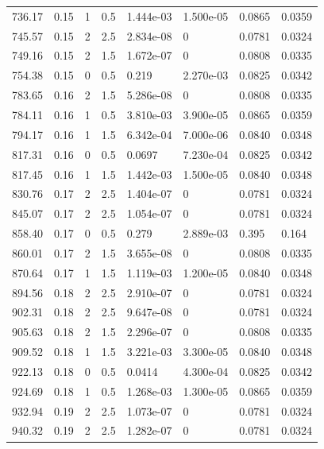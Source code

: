 \documentclass[preview]{standalone}
\begin{document}
{{{\begin{tabular}{L{1.2cm}C{1.2cm} C{0.3cm}C{0.5cm} C{1.4cm}C{1.4cm} C{1.4cm}C{1.4cm}}
  736.17  &  0.15  & 1     & 0.5 &  1.444e-03  & 1.500e-05  & 0.0865 &  0.0359   \\ 
  745.57  &  0.15  & 2     & 2.5 &  2.834e-08  & 0  & 0.0781 &  0.0324   \\ 
  749.16  &  0.15  & 2     & 1.5 &  1.672e-07  & 0  & 0.0808 &  0.0335   \\ 
  754.38  &  0.15  & 0     & 0.5 &  0.219  & 2.270e-03  & 0.0825 &  0.0342   \\ 
  783.65  &  0.16  & 2     & 1.5 &  5.286e-08  & 0  & 0.0808 &  0.0335   \\ 
  784.11  &  0.16  & 1     & 0.5 &  3.810e-03  & 3.900e-05  & 0.0865 &  0.0359   \\ 
  794.17  &  0.16  & 1     & 1.5 &  6.342e-04  & 7.000e-06  & 0.0840 &  0.0348   \\ 
  817.31  &  0.16  & 0     & 0.5 &  0.0697  & 7.230e-04  & 0.0825 &  0.0342   \\ 
  817.45  &  0.16  & 1     & 1.5 &  1.442e-03  & 1.500e-05  & 0.0840 &  0.0348   \\ 
  830.76  &  0.17  & 2     & 2.5 &  1.404e-07  & 0  & 0.0781 &  0.0324   \\ 
  845.07  &  0.17  & 2     & 2.5 &  1.054e-07  & 0  & 0.0781 &  0.0324   \\ 
  858.40  &  0.17  & 0     & 0.5 &  0.279  & 2.889e-03  & 0.395 &  0.164   \\ 
  860.01  &  0.17  & 2     & 1.5 &  3.655e-08  & 0  & 0.0808 &  0.0335   \\ 
  870.64  &  0.17  & 1     & 1.5 &  1.119e-03  & 1.200e-05  & 0.0840 &  0.0348   \\ 
  894.56  &  0.18  & 2     & 2.5 &  2.910e-07  & 0  & 0.0781 &  0.0324   \\ 
  902.31  &  0.18  & 2     & 2.5 &  9.647e-08  & 0  & 0.0781 &  0.0324   \\ 
  905.63  &  0.18  & 2     & 1.5 &  2.296e-07  & 0  & 0.0808 &  0.0335   \\ 
  909.52  &  0.18  & 1     & 1.5 &  3.221e-03  & 3.300e-05  & 0.0840 &  0.0348   \\ 
  922.13  &  0.18  & 0     & 0.5 &  0.0414  & 4.300e-04  & 0.0825 &  0.0342   \\ 
  924.69  &  0.18  & 1     & 0.5 &  1.268e-03  & 1.300e-05  & 0.0865 &  0.0359   \\ 
  932.94  &  0.19  & 2     & 2.5 &  1.073e-07  & 0  & 0.0781 &  0.0324   \\ 
  940.32  &  0.19  & 2     & 2.5 &  1.282e-07  & 0  & 0.0781 &  0.0324   \\ 

\end{tabular}}}}
\end{document}
